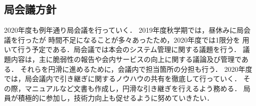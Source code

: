 \subsection*{局会議方針}


 2020年度も例年通り局会議を行っていく．
 2019年度秋学期では，昼休みに局会議を行ったが
 時間不足になることが多々あったため，2020年度では1限分を
 用いて行う予定である．局会議では本会のシステム管理に関する議題を行う．
 議題内容は，主に脆弱性の報告や会内サービスの向上に関する議論及び管理である．
 それらを円滑に進めるために，会議内で担当箇所の分担も行う．
 2020年度では，局会議内で引き継ぎに関するノウハウの共有を徹底して行っていく．
 その際，マニュアルなど文書も作成し，円滑な引き継ぎを行えるよう務める．
 局員が積極的に参加し，技術力向上も促せるように努めていきたい．
